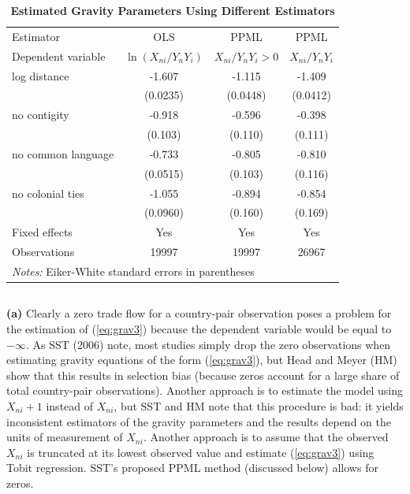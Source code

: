 \documentclass[12pt]{article}
\begin{document}
\begin{table}[!htbp]
\centering
\caption{\textbf{Estimated Gravity Parameters Using Different Estimators}}
\begin{tabular}{l*{3}{c}}
\hline
Estimator                    &OLS& PPML &PPML\\
Dependent variable                    & $\ln(X_{ni}/Y_nY_i)$ &$X_{ni}/Y_nY_i>0$&$X_{ni}/Y_nY_i$\\
\hline
log distance              &      -1.607&      -1.115&      -1.409\\
                    &    (0.0235)&    (0.0448)&    (0.0412)\\

no contigity            &      -0.918&      -0.596&      -0.398\\
                    &     (0.103)&     (0.110)&     (0.111)\\

no common language             &      -0.733&      -0.805&      -0.810\\
                    &    (0.0515)&     (0.103)&     (0.116)\\

no colonial ties               &      -1.055&      -0.894&      -0.854\\
                    &    (0.0960)&     (0.160)&     (0.169)\\
Fixed effects & Yes & Yes & Yes\\
\hline
Observations        &       19997&       19997&       26967\\
\hline
\multicolumn{4}{l}{\textit{Notes:} Eiker-White standard errors in parentheses}\\
\end{tabular}
\end{table}


\subsection{}
\textbf{(a)} Clearly a zero trade flow for a country-pair observation poses a problem for the estimation of (\ref{eq:grav3}) because the dependent variable would be equal to $- \infty$. As SST (2006) note, most studies simply drop the zero observations when estimating gravity equations of the form (\ref{eq:grav3}), but Head and Meyer (HM) show that this results in selection bias (because zeros account for a large share of total country-pair observations). Another approach is to estimate the model using $X_{ni}+1$ instead of $X_{ni}$, but SST and HM note that this procedure is bad: it yields inconsistent estimators of the gravity parameters and the results depend on the units of measurement of $X_{ni}$. Another approach is to assume that the observed $X_{ni}$ is truncated at its lowest observed value and estimate (\ref{eq:grav3}) using Tobit regression. SST's proposed PPML method (discussed below) allows for zeros.\\
\end{document}
